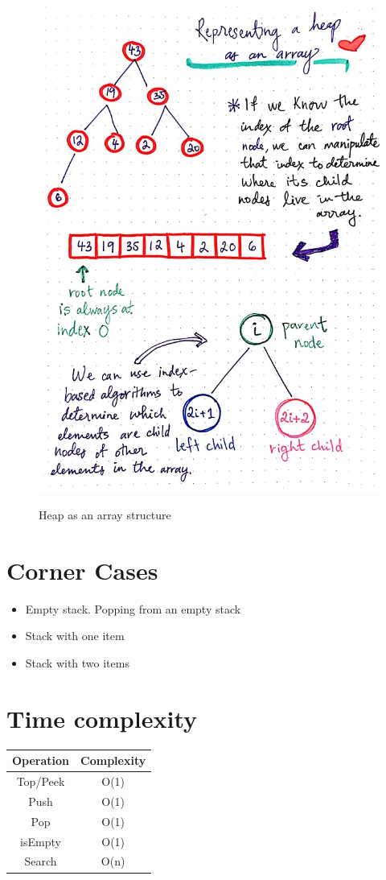 	\begin{figure}
		\centering
		\scalebox{0.40}
			{\includegraphics{images/heap_1}}
		\caption{Heap as an array structure}
	\end{figure}	

	\section{Corner Cases}
		\begin{itemize}
			\item Empty stack. Popping from an empty stack
			\item Stack with one item
			\item Stack with two items
		\end{itemize}
		
	
	\section{Time complexity}
	
	\begin{center}
		\begin{tabular}{||c c||}
		\hline
		Operation & Complexity\\
		\hline\hline
		Top/Peek & O(1)\\
		\hline
		Push & O(1)\\
		\hline
		Pop & O(1)\\
		\hline
		isEmpty & O(1)\\
		\hline
		Search & O(n)\\
		\hline
			
		\end{tabular}
	\end{center}
	
	
	